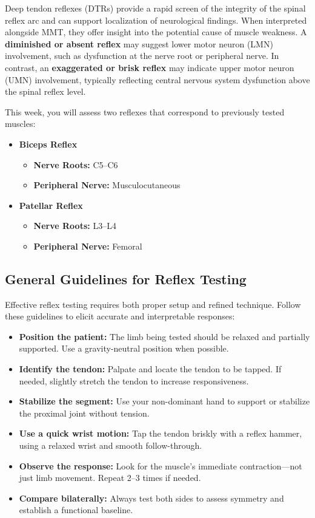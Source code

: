 Deep tendon reflexes (DTRs) provide a rapid screen of the integrity of the spinal reflex arc and can support localization of neurological findings. When interpreted alongside MMT, they offer insight into the potential cause of muscle weakness. A \textbf{diminished or absent reflex} may suggest lower motor neuron (LMN) involvement, such as dysfunction at the nerve root or peripheral nerve. In contrast, an \textbf{exaggerated or brisk reflex} may indicate upper motor neuron (UMN) involvement, typically reflecting central nervous system dysfunction above the spinal reflex level.

This week, you will assess two reflexes that correspond to previously tested muscles:

\begin{itemize}
  \item \textbf{Biceps Reflex}
  \begin{itemize}
    \item \textbf{Nerve Roots:} C5–C6
    \item \textbf{Peripheral Nerve:} Musculocutaneous
  \end{itemize}

  \item \textbf{Patellar Reflex}
  \begin{itemize}
    \item \textbf{Nerve Roots:} L3–L4
    \item \textbf{Peripheral Nerve:} Femoral
  \end{itemize}
\end{itemize}

\subsection*{General Guidelines for Reflex Testing}

Effective reflex testing requires both proper setup and refined technique. Follow these guidelines to elicit accurate and interpretable responses:

\begin{itemize}
  \item \textbf{Position the patient:} The limb being tested should be relaxed and partially supported. Use a gravity-neutral position when possible.
  \item \textbf{Identify the tendon:} Palpate and locate the tendon to be tapped. If needed, slightly stretch the tendon to increase responsiveness.
  \item \textbf{Stabilize the segment:} Use your non-dominant hand to support or stabilize the proximal joint without tension.
  \item \textbf{Use a quick wrist motion:} Tap the tendon briskly with a reflex hammer, using a relaxed wrist and smooth follow-through.
  \item \textbf{Observe the response:} Look for the muscle’s immediate contraction—not just limb movement. Repeat 2–3 times if needed.
  \item \textbf{Compare bilaterally:} Always test both sides to assess symmetry and establish a functional baseline.
\end{itemize}

